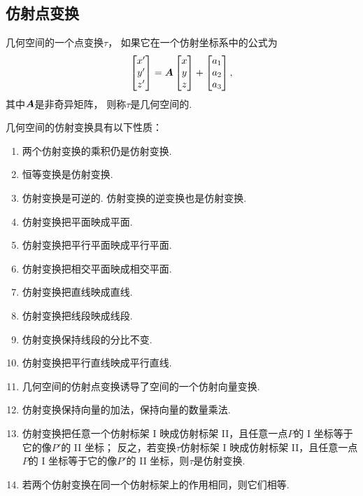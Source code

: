 
\subsection{仿射点变换}
\begin{definition}
几何空间的一个点变换\(\tau\)，
如果它在一个仿射坐标系中的公式为\begin{equation*}
	\begin{bmatrix}
		x' \\ y' \\ z'
	\end{bmatrix}
	= \boldsymbol{A}
	\begin{bmatrix}
		x \\ y \\ z
	\end{bmatrix}
	+ \begin{bmatrix}
		a_1 \\ a_2 \\ a_3
	\end{bmatrix},
\end{equation*}
其中\(\boldsymbol{A}\)是非奇异矩阵，
则称\(\tau\)是几何空间的.
\end{definition}

几何空间的仿射变换具有以下性质：\begin{enumerate}
	\item 两个仿射变换的乘积仍是仿射变换.
	\item 恒等变换是仿射变换.
	\item 仿射变换是可逆的.
	仿射变换的逆变换也是仿射变换.
	\item 仿射变换把平面映成平面.
	\item 仿射变换把平行平面映成平行平面.
	\item 仿射变换把相交平面映成相交平面.
	\item 仿射变换把直线映成直线.
	\item 仿射变换把线段映成线段.
	\item 仿射变换保持线段的分比不变.
	\item 仿射变换把平行直线映成平行直线.
	\item 几何空间的仿射点变换诱导了空间的一个仿射向量变换.
	\item 仿射变换保持向量的加法，保持向量的数量乘法.
	\item 仿射变换把任意一个仿射标架 I 映成仿射标架 II，且任意一点\(P\)的 I 坐标等于它的像\(P'\)的 II 坐标；
	反之，若变换\(\tau\)仿射标架 I 映成仿射标架 II，且任意一点\(P\)的 I 坐标等于它的像\(P'\)的 II 坐标，则\(\tau\)是仿射变换.
	\item 若两个仿射变换在同一个仿射标架上的作用相同，则它们相等.
\end{enumerate}

